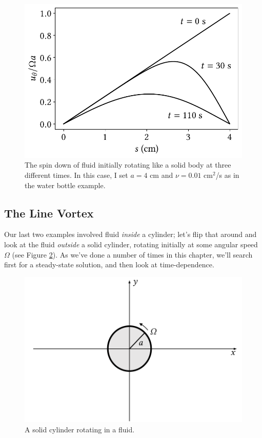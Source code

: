 \begin{figure}
\centering
\includegraphics[width=0.7\linewidth]{Figures/Chapter2/fig_spin_vel}
\caption{The spin down of fluid initially rotating like a solid body at three different times. In this case, I set $a = 4$ cm and $\nu = 0.01$ cm$^2$/s as in the water bottle example.}
\label{fig_spin_vel}
\end{figure}



\subsection{The Line Vortex}
\label{sec_line_vortex}

Our last two examples involved fluid \emph{inside} a cylinder; let's flip that around and look at the fluid \emph{outside} a solid cylinder, rotating initially at some angular speed $\Omega$ (see Figure \ref{fig_line_setup}).  As we've done a number of times in this chapter, we'll search first for a steady-state solution, and then look at time-dependence.

\begin{figure}
\centering
\includegraphics[width=0.7\linewidth]{Figures/Chapter2/fig_line_setup}
\caption{A solid cylinder rotating in a fluid.}
\label{fig_line_setup}
\end{figure}

